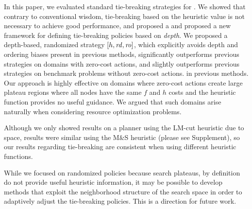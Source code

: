 In this paper, we evaluated standard tie-breaking
strategies for \astar.
We showed that contrary to conventional wisdom, tie-breaking based on the heuristic value is not necessary to achieve good performance, and proposed a 
and proposed a new framework for defining tie-breaking policies based on \emph{depth}.
We proposed a depth-based, randomized strategy $[h,\mbox{\textit{rd}},\mbox{\textit{ro}}]$, which explicitly avoids depth and ordering biases present in previous methods,
significantly outperforms previous strategies on domains with zero-cost actions, 
and slightly outperforms previous strategies on benchmark problems without zero-cost actions.
in previous methods. 
Our approach is highly effective on domains where zero-cost actions create large plateau regions where all nodes have the same $f$ and $h$ costs
and the heuristic function provides no useful guidance.
We argued that such domains arise naturally when considering resource optimization problems.


Although we only showed results on a planner using the LM-cut heuristic due to space, 
results were similar using the M\&S heuristic  (please see Supplement), so our results regarding tie-breaking are consistent when using different heuristic functions.




While we focused on randomized policies because search plateaus, by definition do not provide useful heuristic information,
it may be possible to develop methods that exploit the neighborhood structure of the search space
in order to adaptively adjust the tie-breaking policies. This is a direction for future work.





